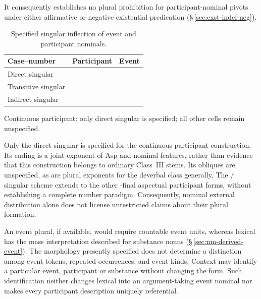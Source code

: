 It consequently establishes no plural prohibition for participant-nominal
pivots under either affirmative or negative existential predication
(§\,\ref{sec:exst-indef-neg}).

\begin{table}[htbp]
\footnotesize
\caption{Specified singular inflection of event and participant nominals.}\label{tab:ou-inflection}
\label{tab:ova-inflection}
\begin{tabularx}{\textwidth}{l L L}
\toprule
Case--number & Participant  & Event  \\
\midrule
Direct singular &  &  \\
Transitive singular &  &  \\
Indirect singular &  &  \\
\bottomrule
\end{tabularx}
\par\smallskip
\begin{minipage}{\textwidth}
Continuous participant: only direct singular 
 is specified; all other cells remain unspecified.
\end{minipage}
\end{table}

Only the direct singular  
is specified for the continuous participant construction. Its ending  is a joint exponent of Asp and nominal
features, rather than evidence that this construction belongs to ordinary
Class~III  stems. Its obliques are unspecified, as are
plural exponents for the deverbal class generally. The
/ singular scheme extends to the other
-final aspectual participant forms, without establishing a complete
number paradigm. Consequently, nominal external distribution alone does not
license unrestricted claims about their plural formation.

An event plural, if available, would require countable event units, whereas
lexical  has the mass interpretation described for substance nouns
(§\,\ref{sec:nm-derived-event}). The morphology presently specified does not
determine a distinction among event tokens, repeated occurrences, and event
kinds. Context may identify a particular event, participant or substance
without changing the form. Such identification neither changes lexical
 into an argument-taking event nominal nor makes every
participant description uniquely referential.

